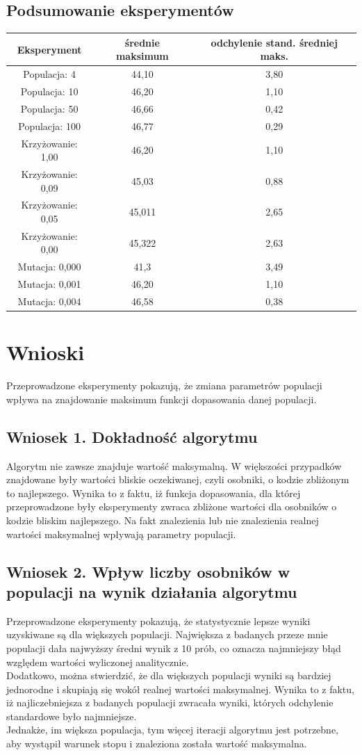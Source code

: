 \documentclass[a4paper,11pt]{article}
\begin{document}
			\subsection{Podsumowanie eksperymentów}
			\begin{tabular}{|c|c|c|}
				\hline
				Eksperyment & średnie maksimum & odchylenie stand. średniej maks. \\\hline
				Populacja: 4  & 44,10 & 3,80\\\hline
				Populacja: 10 &46,20 &1,10 \\\hline
				Populacja: 50 & 46,66& 0,42\\\hline
				Populacja: 100&46,77 &0,29\\\hline
				Krzyżowanie: 1,00& 46,20 & 1,10 \\\hline
				Krzyżowanie: 0,09& 45,03 & 0,88 \\\hline
				Krzyżowanie: 0,05& 45,011 &2,65 \\\hline
				Krzyżowanie: 0,00&  45,322 & 2,63\\\hline
				Mutacja: 0,000& 41,3 & 3,49\\\hline
				Mutacja: 0,001& 46,20 & 1,10\\\hline
				Mutacja: 0,004& 46,58& 0,38 \\\hline
			\end{tabular}
	\section{Wnioski}
		Przeprowadzone eksperymenty pokazują, że zmiana parametrów populacji wpływa na znajdowanie maksimum funkcji dopasowania danej populacji. 
		\subsection{Wniosek 1. Dokładność algorytmu}
		Algorytm nie zawsze znajduje wartość maksymalną. W większości przypadków znajdowane były wartości bliskie oczekiwanej, czyli osobniki, o kodzie zbliżonym to najlepszego. Wynika to z faktu, iż funkcja dopasowania, dla której przeprowadzone były eksperymenty zwraca zbliżone wartości dla osobników o kodzie bliskim najlepszego. Na fakt znalezienia lub nie znalezienia realnej wartości maksymalnej wpływają parametry populacji.
		\subsection{Wniosek 2. Wpływ liczby osobników w populacji na wynik działania algorytmu}
		Przeprowadzone eksperymenty pokazują, że statystycznie lepsze wyniki uzyskiwane są dla większych populacji. Największa z badanych przeze mnie populacji dała najwyższy średni wynik z 10 prób, co oznacza najmniejszy błąd względem wartości wyliczonej analitycznie.\\ Dodatkowo, można stwierdzić, że dla większych populacji wyniki są bardziej jednorodne i skupiają się wokół realnej wartości maksymalnej. Wynika to z faktu, iż najliczebniejsza z badanych populacji zwracała wyniki, których odchylenie standardowe było najmniejsze. \\
		Jednakże, im większa populacja, tym więcej iteracji algorytmu jest potrzebne, aby wystąpił warunek stopu i znaleziona została wartość maksymalna.
\end{document}
